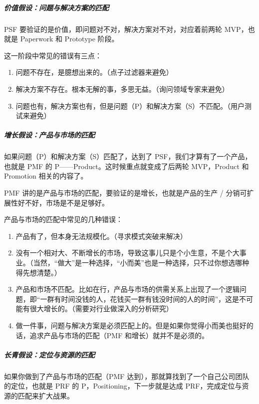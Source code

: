 \documentclass[letterpaper,11pt,english]{sphinxmanual}
\begin{document}
\subparagraph{价值假设：问题与解决方案的匹配}
\label{\detokenize{chapter_introduction/Product:id39}}
PSF 要验证的是价值，即问题对不对，解决方案对不对，对应着前两轮
MVP，也就是 Paperwork 和 Prototype 阶段。

这一阶段中常见的错误有三点：
\begin{enumerate}
%
\item {} 
问题不存在，是臆想出来的。（点子过滤器来避免）

\item {} 
解决方案不存在。根本无解的事，多思无益。（询问领域专家来避免）

\item {} 
问题也有，解决方案也有，但是问题（P）和解决方案（S）不匹配。（用户测试来避免）

\end{enumerate}


\subparagraph{增长假设：产品与市场的匹配}
\label{\detokenize{chapter_introduction/Product:id40}}
如果问题（P）和解决方案（S）匹配了，达到了
PSF，我们才算有了一个产品，也就是 PMF 的
P——Product。这时候重点就变成了后两轮 MVP，Product 和 Promotion
相关的内容了。

PMF 讲的是产品与市场的匹配，要验证的是增长，也就是产品的生产 /
分销可扩展性好不好，市场是不是足够好。

产品与市场的匹配中常见的几种错误：
\begin{enumerate}
%
\item {} 
产品有了，但本身无法规模化。（寻求模式突破来解决）

\item {} 
没有一个相对大、不断增长的市场，导致这事儿只是个小生意，不是个大事业。（当然，“做大”是一种选择，“小而美”也是一种选择，只不过你想选哪种得先想清楚。）

\item {} 
产品和市场不匹配。比如在行，产品与市场的供需关系上出现了一个逻辑问题，即“一群有时间没钱的人，花钱买一群有钱没时间的人的时间”，这是不可能有很大增长的。（需要对行业做深入的分析研究）

\item {} 
做一件事，问题与解决方案是必须匹配上的。但是如果你觉得小而美也挺好的话，追求产品与市场的匹配（PMF
和增长）就并不是必须的。

\end{enumerate}


\subparagraph{长青假设：定位与资源的匹配}
\label{\detokenize{chapter_introduction/Product:id41}}
如果你做到了产品与市场的匹配（PMF
达到），那就算找到了一个自己公司团队的定位，也就是 PRF 的
P，Positioning，下一步就是达成 PRF，完成定位与资源的匹配来扩大战果。
\end{document}

